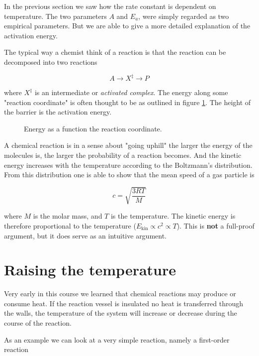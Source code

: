 In the previous section we saw how the rate constant is dependent on temperature. The two parameters $A$ and $E_a$, were simply regarded as two empirical parameters. But we are able to give a more detailed explanation of the activation energy.

The typical way a chemist think of a reaction is that the reaction can be decomposed into two reactions \ie

\begin{equation}
    A \rightarrow X^\ddagger \rightarrow P
\end{equation}

where $X^\ddagger$ is an intermediate or \textit{activated complex}. The energy along some "reaction coordinate" is often thought to be as outlined in figure \ref{fig:ActivatedComplex}. The height of the barrier is the activation energy.

\begin{figure}
    \caption{Energy as a function the reaction coordinate.}
    \label{fig:ActivatedComplex}
\end{figure}

A chemical reaction is in a sense about "going uphill" \ie the larger the energy of the molecules is, the larger the probability of a reaction becomes. And the kinetic energy increases with the temperature according to the Boltzmann’s distribution. From this distribution one is able to show that the mean speed of a gas particle is

\begin{equation}
    c = \sqrt{\frac{3RT}{M}}
\end{equation}

where $M$ is the molar mass, and $T$ is the temperature. The kinetic energy is therefore proportional to the temperature ($E_{\mathrm{kin}} \propto c^2 \propto T$). This is \textbf{not} a full-proof argument, but it does serve as an intuitive argument.

\section{Raising the temperature}
\label{sect:RaisingTemperature}

Very early in this course we learned that chemical reactions may produce or consume heat. If the reaction vessel is insulated \ie no heat is transferred through the walls, the temperature of the system will increase or decrease during the course of the reaction.

As an example we can look at a very simple reaction, namely a first-order reaction

